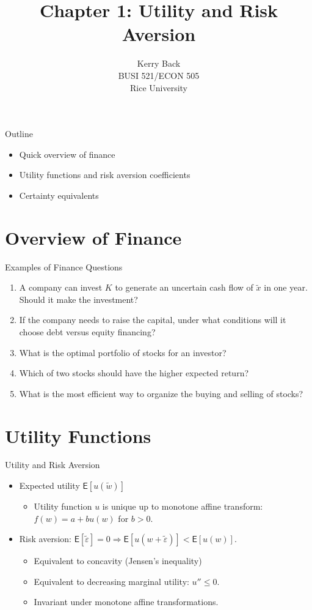 \documentclass[10pt]{beamer}
\title{Chapter 1: Utility and Risk Aversion}
\date{}
\author{Kerry Back\\ 
BUSI 521/ECON 505\\
Rice University}
\newcommand{\bi}{\begin{itemize}}
\newcommand{\ei}{\end{itemize}}
\newcommand{\im}{\item}
\newcommand{\mye}{\ensuremath{\mathsf{E}}}
\begin{document}
\maketitle

\begin{frame}{Outline}
  \bi 
  \im Quick overview of finance
  \im Utility functions and risk aversion coefficients
  \im Certainty equivalents
  \ei
\end{frame}

\section{Overview of Finance}


\begin{frame}{Examples of Finance Questions}

\begin{enumerate}
\item A company can invest $K$ to generate an uncertain cash flow of $\tilde{x}$ in one year.  Should it make the investment?
\item If the company needs to raise the capital, under what conditions will it choose debt versus equity financing?
\item What is the optimal portfolio of stocks for an investor?
\item Which of two stocks should have the higher expected return?
\item What is the most efficient way to organize the buying and selling of stocks?
\end{enumerate}
\end{frame}

\section{Utility Functions}

\begin{frame}{Utility and Risk Aversion}
\bi

\im Expected utility $\mye[u(\tilde{w})]$
\bi
\im Utility function $u$ is unique up to monotone affine transform: $f(w) = a+b u(w)$ for $b>0$.
\ei

\im Risk aversion: $\mye[\tilde{\varepsilon}]=0 \Rightarrow \mye[u(w+\tilde{\varepsilon})] < \mye[u(w)]$.
\bi
\im Equivalent to concavity (Jensen's inequality)
\im Equivalent to decreasing marginal utility: $u'' \leq 0$.
\im Invariant under monotone affine transformations.
\ei

\ei
\end{frame}
\end{document}
